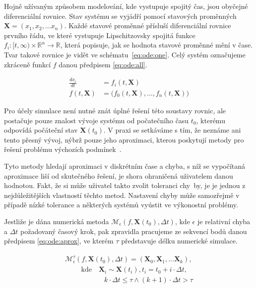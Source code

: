 Hojně užívaným způsobem modelování, kde vystupuje spojitý čas, jsou obyčejné diferenciální rovnice.
Stav systému se vyjádří pomocí stavových pro\-měn\-ných $\mathbf{X} = (\mathit{x_1}, \mathit{x_2}, \dots \mathit{x_n})$.
Každé stavové proměnné přísluší diferenciální rovni\-ce prvního řádu, ve které vystupuje
Lipschitzovsky spojitá \cite[str. 149 -- 163]{eriksson2004} funkce
$f_i: [t, \infty) \times \mathbb{R}^n \rightarrow \mathbb{R}$, která popisuje,
jak se hodnota stavové proměnné mění v čase. Tvar takové rovnice je vidět ve sché\-ma\-tu~\ref{eq:ode:one}.
Celý systém označujeme zkráceně funkcí $f$ danou předpisem \ref{eq:ode:all}.

\begin{align}
\label{eq:ode:one}
\frac{d\mathit{x_i}}{dt} &= f_i(t, \mathbf{X})									\\
\label{eq:ode:all}
f(t, \mathbf{X})		 &= \big(f_0(t, \mathbf{X}), \ldots, f_n(t, \mathbf{X})\big)
\end{align}

Pro účely simulace není nutné znát úplné řešení této soustavy rovnic, ale postačuje pouze znalost
vývoje systému od počatečního času $t_0$, kterému odpovídá počáteční stav $\mathbf{X}(t_0)$.
V praxi se setkáváme s tím, že neznáme ani tento přesný vývoj, nýbrž pouze jeho aproximaci,
kterou poskytují metody pro řešení problému výchozích podmínek~\cite{iserles1996}.

Tyto metody hledají aproximaci v diskrétním čase a chyba, s níž se vy\-po\-čí\-ta\-ná
aproximace liší od skutečného řešení, je shora ohraničená uživatelem danou hodnotou.
Fakt, že si může uživatel takto zvolit toleranci chy~by, je je jednou z nejdůležitějších
vlastností těchto metod. Nastavení chyby může samozřejmě v případě nízké tolerance
a některých systémů vyústit ve výkonostní problémy.

Jestliže je dána numerická metoda $\mathcal{M}_\epsilon(f, \mathbf{X}(t_0), \Delta t)$,
kde $\epsilon$ je relativní chyba a $\Delta t$ požadovaný časový krok,
pak zpravidla pracujeme ze sekvencí bodů danou předpisem \ref{eq:ode:aprox},
ve kterém $\tau$ představuje délku numerické simulace.

\begin{align}
\begin{array}{ll}
\label{eq:ode:aprox}
\mathcal{M}^\tau_\epsilon(f, \mathbf{X}(t_0), \Delta t) = (\mathbf{X}_0, \mathbf{X}_1, \ldots \mathbf{X}_k), \\
\textrm{~~~~~~~kde~~~}\mathbf{X}_i \sim \mathbf{X}(t_i), t_i = t_0 + i \cdot \Delta t,	\\
\textrm{~~~~~~~~~~~~~~~~~}k \cdot \Delta t \leq \tau \wedge (k+1) \cdot \Delta t > \tau
\end{array}
\end{align}

